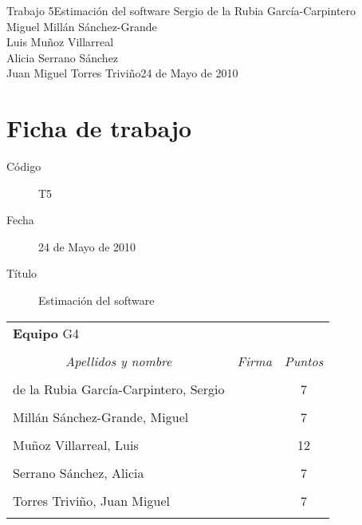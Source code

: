 \documentclass[11pt,a4paper,spanish,twoside]{book}
\begin{document}


{Trabajo 5}{Estimación del software}
{Sergio de la Rubia García-Carpintero\\Miguel Millán Sánchez-Grande\\
  Luis Muñoz Villarreal\\Alicia Serrano Sánchez\\
  Juan Miguel Torres Triviño}{24 de Mayo de 2010}


\chapter*{Ficha de trabajo}
\begin{description}
\item[Código] T5
\item[Fecha] 24 de Mayo de 2010
\item[Título] Estimación del software
\end{description}

\begin{table}[!ht]
  \centering
  \begin{tabular}{lp{5cm}c}
    \multicolumn{3}{l}{\Large \textbf{Equipo} G4} \\ \\
    \multicolumn{1}{c}{\emph{Apellidos y nombre}} & 
    \multicolumn{1}{c}{\emph{Firma}} & \emph{Puntos} \\
    \hline \\
    de la Rubia García-Carpintero, Sergio & & 7 \\ \\
    Millán Sánchez-Grande, Miguel         & & 7 \\ \\
    Muñoz Villarreal, Luis                & & 12 \\ \\
    Serrano Sánchez, Alicia               & & 7 \\ \\
    Torres Triviño, Juan Miguel           & & 7 \\ \\
    \hline
  \end{tabular}
\end{table}
\end{document}

